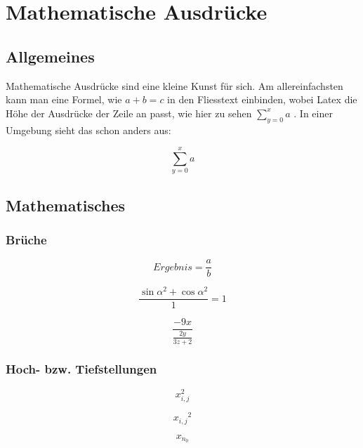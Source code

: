 \chapter{Mathematische Ausdrücke}
\section{Allgemeines}

Mathematische Ausdrücke sind eine kleine Kunst für sich. Am allereinfachsten kann man eine Formel, wie \(a + b = c\) in den Fliesstext einbinden, wobei Latex die Höhe der Ausdrücke der Zeile an passt, wie hier zu sehen \(\sum_{y=0}^{x} a\) . In einer Umgebung sieht das schon anders aus:

\begin{equation}
  \sum_{y=0}^{x} a
\end{equation}

\section{Mathematisches}
\subsection{Brüche}

\begin{equation}
Ergebnis = \frac{a}{b}
\end{equation}

\begin{equation}
\frac{\sin{\alpha}^2 + \cos{\alpha}^2}{1} = 1
\end{equation}

\begin{equation}
\frac{-9x}{\frac{2y}{3z+2}}
\end{equation}

\subsection{Hoch- bzw. Tiefstellungen}

\begin{equation}
x_{i,j}^2
\end{equation}

\begin{equation}
{x_{i,j}}^2
\end{equation}

\begin{equation}
x_{n_0}
\end{equation}

